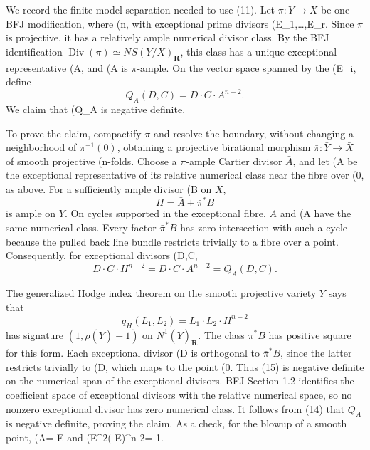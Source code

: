 We record the finite-model separation needed to use (11).  Let
\(\pi:Y\to X\) be one BFJ modification, where (n\), with exceptional
prime divisors (E_1,\ldots,E_r\).  Since \(\pi\) is projective, it has a
relatively ample numerical divisor class.  By the BFJ identification
\(\operatorname{Div}(\pi)\simeq NS(Y/X)_{\mathbf R}\), this class has a
unique exceptional representative (A\), and (A\) is \(\pi\)-ample.  On
the vector space spanned by the (E_i\), define
\[
                         Q_A(D,C)=D\cdot C\cdot A^{n-2}.
\tag{12}
\]
We claim that (Q_A\) is negative definite.

To prove the claim, compactify \(\pi\) and resolve the boundary, without
changing a neighborhood of \(\pi^{-1}(0)\), obtaining a projective
birational morphism \(\bar\pi:\bar Y\to\bar X\) of smooth projective
(n\)-folds.  Choose a \(\bar\pi\)-ample Cartier divisor \(\bar A\), and
let (A\) be the exceptional representative of its relative numerical
class near the fibre over (0\), as above.  For a sufficiently ample divisor
(B\) on \(\bar X\),
\[
                         H=\bar A+\bar\pi^*B
\tag{13}
\]
is ample on \(\bar Y\).  On cycles supported in the exceptional fibre,
\(\bar A\) and (A\) have the same numerical class.  Every factor
\(\bar\pi^*B\) has zero intersection with such a cycle because the pulled
back line bundle restricts trivially to a fibre over a point.  Consequently,
for exceptional divisors (D,C\),
\[
 D\cdot C\cdot H^{n-2}=D\cdot C\cdot A^{n-2}=Q_A(D,C).
\tag{14}
\]

The generalized Hodge index theorem on the smooth projective variety
\(\bar Y\) says that
\[
 q_H(L_1,L_2)=L_1\cdot L_2\cdot H^{n-2}
\tag{15}
\]
has signature \((1,\rho(\bar Y)-1)\) on
\(N^1(\bar Y)_{\mathbf R}\).  The class \(\bar\pi^*B\) has positive square
for this form.  Each exceptional divisor (D\) is orthogonal to
\(\bar\pi^*B\), since the latter restricts trivially to (D\), which maps to
the point (0\).  Thus (15) is negative definite on the numerical span of
the exceptional divisors.  BFJ Section 1.2 identifies the coefficient space
of exceptional divisors with the relative numerical space, so no nonzero
exceptional divisor has zero numerical class.  It follows from (14) that
\(Q_A\) is negative definite, proving the claim.  As a check, for the blowup
of a smooth point, (A=-E\) and (E^2(-E)^{n-2}=-1\).

